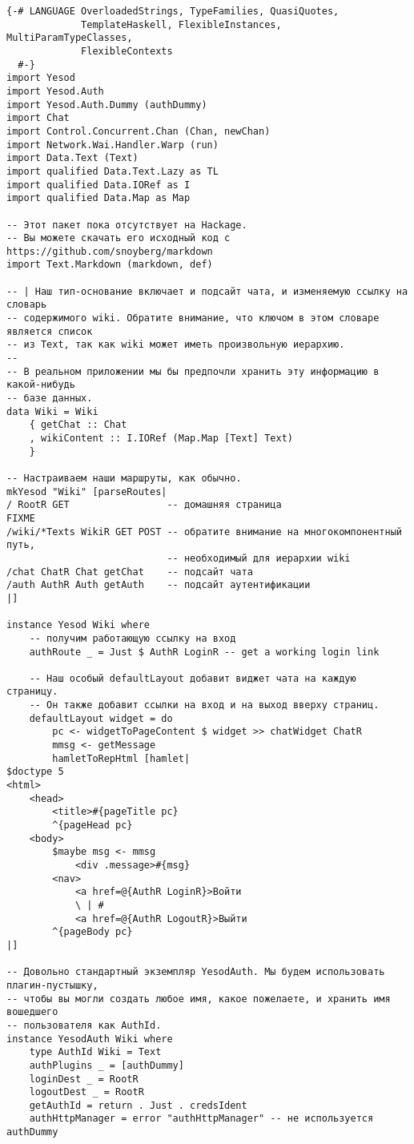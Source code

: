 \begin{lstlisting}
{-# LANGUAGE OverloadedStrings, TypeFamilies, QuasiQuotes,
             TemplateHaskell, FlexibleInstances, MultiParamTypeClasses,
             FlexibleContexts
  #-}
import Yesod
import Yesod.Auth
import Yesod.Auth.Dummy (authDummy)
import Chat
import Control.Concurrent.Chan (Chan, newChan)
import Network.Wai.Handler.Warp (run)
import Data.Text (Text)
import qualified Data.Text.Lazy as TL
import qualified Data.IORef as I
import qualified Data.Map as Map

-- Этот пакет пока отсутствует на Hackage.
-- Вы можете скачать его исходный код с https://github.com/snoyberg/markdown
import Text.Markdown (markdown, def)

-- | Наш тип-основание включает и подсайт чата, и изменяемую ссылку на словарь
-- содержимого wiki. Обратите внимание, что ключом в этом словаре является список
-- из Text, так как wiki может иметь произвольную иерархию.
--
-- В реальном приложении мы бы предпочли хранить эту информацию в какой-нибудь
-- базе данных.
data Wiki = Wiki
    { getChat :: Chat
    , wikiContent :: I.IORef (Map.Map [Text] Text)
    }

-- Настраиваем наши маршруты, как обычно.
mkYesod "Wiki" [parseRoutes|
/ RootR GET                 -- домашняя страница
FIXME
/wiki/*Texts WikiR GET POST -- обратите внимание на многокомпонентный путь,
                            -- необходимый для иерархии wiki
/chat ChatR Chat getChat    -- подсайт чата
/auth AuthR Auth getAuth    -- подсайт аутентификации
|]

instance Yesod Wiki where
    -- получим работающую ссылку на вход
    authRoute _ = Just $ AuthR LoginR -- get a working login link

    -- Наш особый defaultLayout добавит виджет чата на каждую страницу.
    -- Он также добавит ссылки на вход и на выход вверху страниц.
    defaultLayout widget = do
        pc <- widgetToPageContent $ widget >> chatWidget ChatR
        mmsg <- getMessage
        hamletToRepHtml [hamlet|
$doctype 5
<html>
    <head>
        <title>#{pageTitle pc}
        ^{pageHead pc}
    <body>
        $maybe msg <- mmsg
            <div .message>#{msg}
        <nav>
            <a href=@{AuthR LoginR}>Войти
            \ | #
            <a href=@{AuthR LogoutR}>Выйти
        ^{pageBody pc}
|]

-- Довольно стандартный экземпляр YesodAuth. Мы будем использовать плагин-пустышку,
-- чтобы вы могли создать любое имя, какое пожелаете, и хранить имя вошедшего
-- пользователя как AuthId.
instance YesodAuth Wiki where
    type AuthId Wiki = Text
    authPlugins _ = [authDummy]
    loginDest _ = RootR
    logoutDest _ = RootR
    getAuthId = return . Just . credsIdent
    authHttpManager = error "authHttpManager" -- не используется authDummy


\end{lstlisting}
